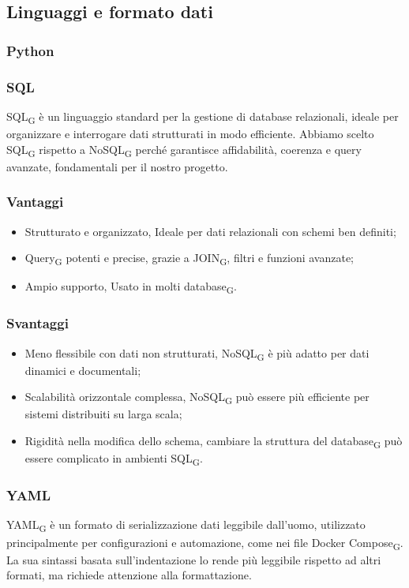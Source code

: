 \subsection{Linguaggi e formato dati}
\subsubsection{Python}

\subsubsection{SQL}
SQL\textsubscript{G} è un linguaggio standard per la gestione di database relazionali, ideale per organizzare e interrogare dati strutturati in modo efficiente. Abbiamo scelto SQL\textsubscript{G} rispetto a NoSQL\textsubscript{G} perché garantisce affidabilità, coerenza e query avanzate, fondamentali per il nostro progetto.
\subsubsection{Vantaggi}
\begin{itemize}
    \item Strutturato e organizzato, Ideale per dati relazionali con schemi ben definiti;
    \item Query\textsubscript{G} potenti e precise, grazie a JOIN\textsubscript{G}, filtri e funzioni avanzate;
    \item Ampio supporto, Usato in molti database\textsubscript{G}.
\end{itemize}
\subsubsection{Svantaggi}
\begin{itemize}
    \item Meno flessibile con dati non strutturati, NoSQL\textsubscript{G} è più adatto per dati dinamici e documentali;
    \item Scalabilità orizzontale complessa, NoSQL\textsubscript{G} può essere più efficiente per sistemi distribuiti su larga scala;
    \item Rigidità nella modifica dello schema, cambiare la struttura del database\textsubscript{G} può essere complicato in ambienti SQL\textsubscript{G}.
\end{itemize}

\subsubsection{YAML}
YAML\textsubscript{G} è un formato di serializzazione dati leggibile dall’uomo, utilizzato principalmente per configurazioni e automazione, come nei file Docker Compose\textsubscript{G}. La sua sintassi basata sull’indentazione lo rende più leggibile rispetto ad altri formati, ma richiede attenzione alla formattazione.
